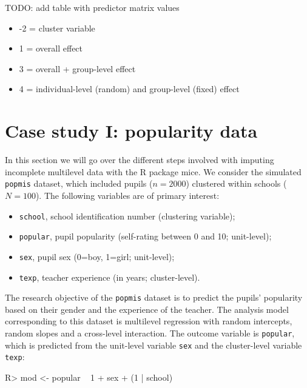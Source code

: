 \documentclass[
]{jss}
\providecommand{\tightlist}{%
  \setlength{\itemsep}{0pt}\setlength{\parskip}{0pt}}
\begin{document}
TODO: add table with predictor matrix values

\begin{itemize}
\tightlist
\item
  -2 = cluster variable
\item
  1 = overall effect
\item
  3 = overall + group-level effect
\item
  4 = individual-level (random) and group-level (fixed) effect
\end{itemize}

\hypertarget{case-study-i-popularity-data}{%
\section{Case study I: popularity
data}\label{case-study-i-popularity-data}}

In this section we will go over the different steps involved with
imputing incomplete multilevel data with the R package mice. We consider
the simulated \texttt{popmis} dataset, which included pupils
(\(n = 2000\)) clustered within schools (\(N = 100\)). The following
variables are of primary interest:

\begin{itemize}
\tightlist
\item
  \texttt{school}, school identification number (clustering variable);
\item
  \texttt{popular}, pupil popularity (self-rating between 0 and 10;
  unit-level);
\item
  \texttt{sex}, pupil sex (0=boy, 1=girl; unit-level);
\item
  \texttt{texp}, teacher experience (in years; cluster-level).
\end{itemize}

The research objective of the \texttt{popmis} dataset is to predict the
pupils' popularity based on their gender and the experience of the
teacher. The analysis model corresponding to this dataset is multilevel
regression with random intercepts, random slopes and a cross-level
interaction. The outcome variable is \texttt{popular}, which is
predicted from the unit-level variable \texttt{sex} and the
cluster-level variable \texttt{texp}:

\begin{CodeChunk}
\begin{CodeInput}
R> mod <- popular ~ 1 + sex + (1 | school)
\end{CodeInput}
\end{CodeChunk}
\end{document}
